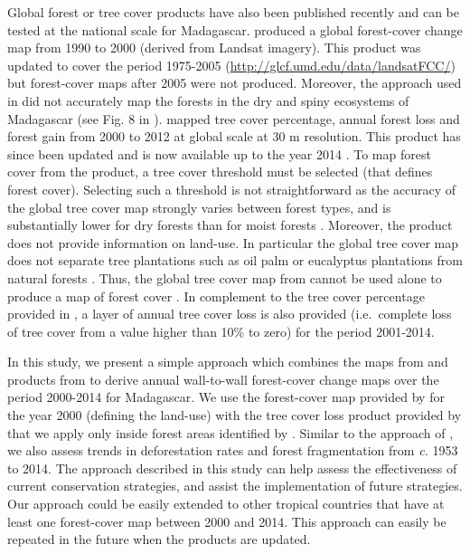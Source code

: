\documentclass[a4paper, 12pt, leqno]{article} %
\begin{document}
Global forest or tree cover products have also been published recently
and can be tested at the national scale for
Madagascar. \citet{Kim2014} produced a global forest-cover change map
from 1990 to 2000 (derived from Landsat imagery). This product was
updated to cover the period 1975-2005
(\url{http://glcf.umd.edu/data/landsatFCC/}) but forest-cover maps
after 2005 were not produced. Moreover, the approach used in
\citet{Kim2014} did not accurately map the forests in the dry and
spiny ecosystems of Madagascar (see Fig. 8 in \citet{Kim2014}).
\citet{Hansen2013} mapped tree cover percentage, annual forest loss
and forest gain from 2000 to 2012 at global scale at 30 m
resolution. This product has since been updated and is now available
up to the year 2014 \citep{Hansen2013}. To map forest cover from the
\citet{Hansen2013} product, a tree cover threshold must be selected
(that defines forest cover). Selecting such a threshold is not
straightforward as the accuracy of the global tree cover map strongly
varies between forest types, and is substantially lower for dry
forests than for moist forests \citep{Bastin2017}. Moreover, the
\citet{Hansen2013} product does not provide information on
land-use. In particular the global tree cover map does not separate
tree plantations such as oil palm or eucalyptus plantations from
natural forests \citep{Tropek2014}. Thus, the global tree cover map
from \citet{Hansen2013} cannot be used alone to produce a map of
forest cover \citep{Tyukavina2017}. In complement to the tree cover
percentage provided in \citet{Hansen2013}, a layer of annual tree
cover loss is also provided (i.e.~complete loss of tree cover from a
value higher than 10\% to zero) for the period 2001-2014.

In this study, we present a simple approach which combines the maps
from \citet{Harper2007} and products from \citet{Hansen2013} to derive
annual wall-to-wall forest-cover change maps over the period 2000-2014
for Madagascar. We use the forest-cover map provided by
\citet{Harper2007} for the year 2000 (defining the land-use) with the
tree cover loss product provided by \citet{Hansen2013} that we apply
only inside forest areas identified by \citet{Harper2007}. Similar to
the approach of \citet{Harper2007}, we also assess trends in
deforestation rates and forest fragmentation from \emph{c.} 1953 to 2014. The
approach described in this study can help assess the effectiveness of
current conservation strategies, and assist the implementation of
future strategies. Our approach could be easily extended to other
tropical countries that have at least one forest-cover map between
2000 and 2014. This approach can easily be repeated in the future when
the \citet{Hansen2013} products are updated.
\end{document}
